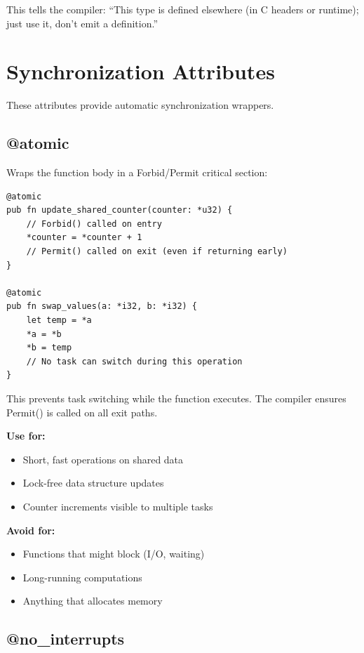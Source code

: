 This tells the compiler: ``This type is defined elsewhere (in C headers or runtime); just use it, don't emit a definition.''

\section{Synchronization Attributes}
\label{sec:sync-attributes}

These attributes provide automatic synchronization wrappers.

\subsection{@atomic}

Wraps the function body in a Forbid/Permit critical section:

\begin{lstlisting}
@atomic
pub fn update_shared_counter(counter: *u32) {
    // Forbid() called on entry
    *counter = *counter + 1
    // Permit() called on exit (even if returning early)
}

@atomic
pub fn swap_values(a: *i32, b: *i32) {
    let temp = *a
    *a = *b
    *b = temp
    // No task can switch during this operation
}
\end{lstlisting}

This prevents task switching while the function executes. The compiler ensures Permit() is called on all exit paths.

\textbf{Use for:}
\begin{itemize}
    \item Short, fast operations on shared data
    \item Lock-free data structure updates
    \item Counter increments visible to multiple tasks
\end{itemize}

\textbf{Avoid for:}
\begin{itemize}
    \item Functions that might block (I/O, waiting)
    \item Long-running computations
    \item Anything that allocates memory
\end{itemize}

\subsection{@no\_interrupts}

